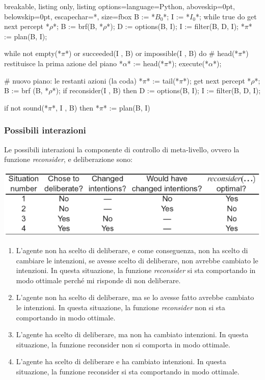 \begin{tcblisting}{breakable, listing only, listing options={language=Python, aboveskip=0pt, belowskip=0pt, escapechar=*}, size=fbox}
B := *$B_0$*;
I := *$I_0$*;
while true do
    get next percept *$\rho$*;
    B := brf(B, *$\rho$*);
    D := options(B, I);
    I := filter(B, D, I);
    *$\pi$* := plan(B, I);
    
    while not empty(*$\pi$*) or
         succeeded(I , B) or
         impossible(I , B) do
        # head(*$\pi$*) restituisce la prima azione del piano 
        *$\alpha$* := head(*$\pi$*);
        execute(*$\alpha$*);
        
        # nuovo piano: le restanti azioni (la coda)
        *$\pi$* := tail(*$\pi$*);
        get next percept *$\rho$*;
        B := brf (B, *$\rho$*);
        if reconsider(I , B) then
            D := options(B, I);
            I := filter(B, D, I);
        
        if not sound(*$\pi$*, I , B) then
            *$\pi$* := plan(B, I)
\end{tcblisting}

\subsubsection{Possibili interazioni}
Le possibili interazioni la componente di controllo di meta-livello, ovvero la funzione \textit{reconsider}, e deliberazione sono:

\begin{center}
    \includegraphics[scale=0.4]{images/Riconsidera Intenzioni Casi D'uso.png}
\end{center}

\begin{enumerate}
    \item L’agente non ha scelto di deliberare, e come conseguenza, non ha scelto di cambiare le intenzioni, se avesse scelto di deliberare, non avrebbe cambiato le intenzioni. In questa situazione, la funzione \textit{reconsider} si sta comportando in modo ottimale perché mi risponde di non deliberare.
    \item L’agente non ha scelto di deliberare, ma se lo avesse fatto avrebbe cambiato le intenzioni. In questa situazione, la funzione \textit{reconsider} non si sta comportando in modo ottimale.
    \item L’agente ha scelto di deliberare, ma non ha cambiato intenzioni. In questa situazione, la funzione reconsider non si comporta in modo ottimale.
    \item L’agente ha scelto di deliberare e ha cambiato intenzioni. In questa situazione, la funzione reconsider si sta comportando in modo ottimale.
\end{enumerate}


